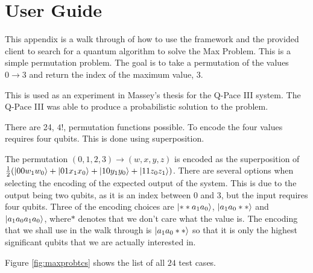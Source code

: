 \chapter{User Guide}

This appendix is a walk through of how to use the framework and the provided client to search for a quantum algorithm to solve the Max Problem.
This is a simple permutation problem.
The goal is to take a permutation of the values $0\rightarrow3$ and return the index of the maximum value, $3$.

This is used as an experiment in Massey's thesis\cite{masseythesis} for the Q-Pace III system.
The Q-Pace III was able to produce a probabilistic solution to the problem.

There are 24, $4!$, permutation functions possible.
To encode the four values requires four qubits.
This is done using superposition.

The permutation $(0,1,2,3)\rightarrow(w,x,y,z)$ is encoded as the superposition of $\frac{1}{2}(\left\vert{00w_1w_0}\right\rangle+\left\vert{01x_1x_0}\right\rangle+\left\vert{10y_1y_0}\right\rangle+\left\vert{11z_0z_1}\right\rangle)$.
There are several options when selecting the encoding of the expected output of the system.
This is due to the output being two qubits, as it is an index between $0$ and $3$, but the input requires four qubits.
Three of the encoding choices are $\left\vert{**a_1a_0}\right\rangle$, $\left\vert{a_1a_0**}\right\rangle$ and $\left\vert{a_1a_0a_1a_0}\right\rangle$, where$*$ denotes that we don't care what the value is.
The encoding that we shall use in the walk through is $\left\vert{a_1a_0**}\right\rangle$ so that it is only the highest significant qubits that we are actually interested in.

Figure \ref{fig:maxprobtcs} shows the list of all $24$ test cases.

